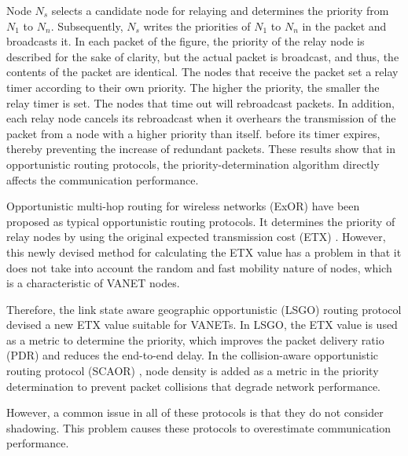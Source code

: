 \documentclass[conference]{IEEEtran}
\begin{document}
Node $N_{s}$ selects a candidate node for relaying and determines the priority from $N_{1}$ to $N_{n}$. Subsequently, $N_{s}$ writes the priorities of $N_{1}$ to $N_{n}$ in the packet and broadcasts it. 
In each packet of the figure, the priority of the relay node is described for the sake of clarity, but the actual packet is broadcast, and thus, the contents of the packet are identical. 
The nodes that receive the packet set a relay timer according to their own priority.
The higher the priority, the smaller the relay timer is set.
The nodes that time out will rebroadcast packets.
In addition, each relay node cancels its rebroadcast when it overhears the transmission of the packet from a node with a higher priority than itself.
before its timer expires, thereby preventing the increase of redundant packets.
These results show that in opportunistic routing protocols, the priority-determination algorithm directly affects  the communication performance.


Opportunistic multi-hop routing for wireless networks (ExOR) \cite{16} have been proposed as typical opportunistic routing protocols. It determines the priority of relay nodes by using the original expected transmission cost (ETX) \cite{21}. However, this newly devised method for calculating the ETX value has a problem in that it does not take into account the random and fast mobility nature of nodes, which is a characteristic of VANET nodes.\par


Therefore, the link state aware geographic opportunistic (LSGO) routing protocol \cite{18} devised a new ETX value suitable for VANETs. In LSGO, the ETX value is used as a metric to determine the priority, which improves the packet delivery ratio (PDR) and reduces the end-to-end delay.
In the collision-aware opportunistic routing protocol (SCAOR) \cite{22}, node density is added as a metric in the priority determination to prevent packet collisions that degrade network performance. 

However, a  common issue in all of these protocols is that they do not consider shadowing.
This problem causes these protocols to overestimate communication performance. 
\end{document}
